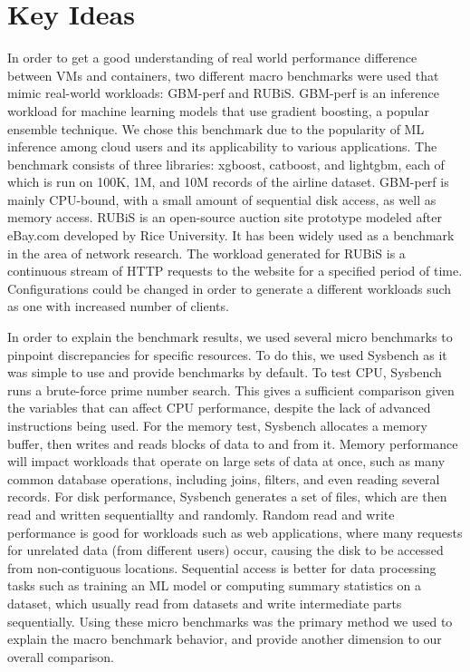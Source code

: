 \documentclass[11pt]{article}
\begin{document}
\vspace{3mm} %

\section{Key Ideas}

In order to get a good understanding of real world performance difference between VMs and containers, two different macro benchmarks were used that mimic real-world workloads: GBM-perf and RUBiS. GBM-perf is an inference workload for machine learning models that use gradient boosting, a popular ensemble technique. We chose this benchmark due to the popularity of ML inference among cloud users and its applicability to various applications. The benchmark consists of three libraries: xgboost, catboost, and lightgbm, each of which is run on 100K, 1M, and 10M records of the airline dataset. GBM-perf is mainly CPU-bound, with a small amount of sequential disk access, as well as memory access. RUBiS is an open-source auction site prototype modeled after eBay.com developed by Rice University. It has been widely used as a benchmark in the area of network research. The workload generated for RUBiS is a continuous stream of HTTP requests to the website for a specified period of time. Configurations could be changed in order to generate a different workloads such as one with increased number of clients. 

In order to explain the benchmark results, we used several micro benchmarks to pinpoint discrepancies for specific resources. To do this, we used Sysbench as it was simple to use and provide benchmarks by default. To test CPU, Sysbench runs a brute-force prime number search. This gives a sufficient comparison given the variables that can affect CPU performance, despite the lack of advanced instructions being used. For the memory test, Sysbench allocates a memory buffer, then writes and reads blocks of data to and from it. Memory performance will impact workloads that operate on large sets of data at once, such as many common database operations, including joins, filters, and even reading several records. For disk performance, Sysbench generates a set of files, which are then read and written sequentiallty and randomly. Random read and write performance is good for workloads such as web applications, where many requests for unrelated data (from different users) occur, causing the disk to be accessed from non-contiguous locations. Sequential access is better for data processing tasks such as training an ML model or computing summary statistics on a dataset, which usually read from datasets and write intermediate parts sequentially. Using these micro benchmarks was the primary method we used to explain the macro benchmark behavior, and provide another dimension to our overall comparison.
\end{document}
